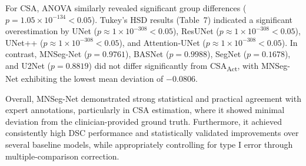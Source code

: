 For CSA, ANOVA similarly revealed significant group differences (\(p = 1.05 \times 10^{-134}< 0.05\)). Tukey’s HSD results (Table~7) indicated a significant overestimation by UNet ($p \approx 1 \times 10^{-308} < 0.05$), ResUNet ($p \approx 1 \times 10^{-308} < 0.05$), UNet++ ($p \approx 1 \times 10^{-308} < 0.05$), and Attention-UNet ($p \approx 1 \times 10^{-308} < 0.05$). In contrast, MNSeg-Net (\(p = 0.9761\)), BASNet (\(p = 0.9988\)), SegNet (\(p = 0.1678\)), and U2Net (\(p = 0.8819\)) did not differ significantly from CSA\textsubscript{Act}, with MNSeg-Net exhibiting the lowest mean deviation of $-0.0806$.

Overall, MNSeg-Net demonstrated strong statistical and practical agreement with expert annotations, particularly in CSA estimation, where it showed minimal deviation from the clinician-provided ground truth. Furthermore, it achieved consistently high DSC performance and statistically validated improvements over several baseline models, while appropriately controlling for type I error through multiple-comparison correction.
 

    

